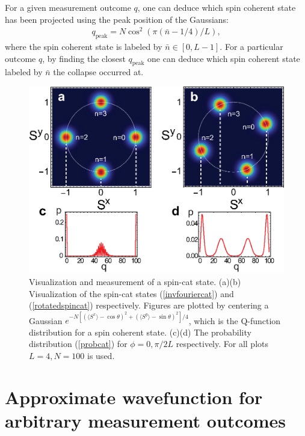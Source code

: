 \documentclass{WileyMSP-template}
\begin{document}
For a given measurement outcome $ q $, one can deduce which spin coherent state has been projected using the peak position of the Gaussians:
%
\begin{align}
q_{\text{peak}} = N \cos^2 ( \pi ( \bar{n}-1/4)/L )  ,
\end{align}
%
where the spin coherent state is labeled by $ \bar{n} \in [0, L-1] $. For a particular outcome $ q $, by finding the closest $ q_{\text{peak}} $ one can deduce which spin coherent state labeled by $ \bar{n} $ the collapse occurred at.



\begin{figure}
    \centering
    \includegraphics[width=0.8\columnwidth]{measurement}
    \caption{Visualization and measurement of a spin-cat state. (a)(b) Visualization of the spin-cat states (\ref{invfouriercat}) and (\ref{rotatedspincat}) respectively. Figures are plotted by centering a Gaussian $ e^{- N[ (\langle S^x \rangle - \cos \theta)^2 + (\langle S^y \rangle - \sin \theta)^2]/4} $, which is the Q-function distribution for a spin coherent state.  (c)(d) The probability distribution (\ref{probcat}) for $ \phi = 0, \pi/2L $ respectively.  For all plots $ L = 4, N = 100 $ is used.  }
    \label{fig:measurement}
\end{figure}






















\section{Approximate wavefunction for arbitrary measurement outcomes}
\label{sec:approxwav}
\end{document}

